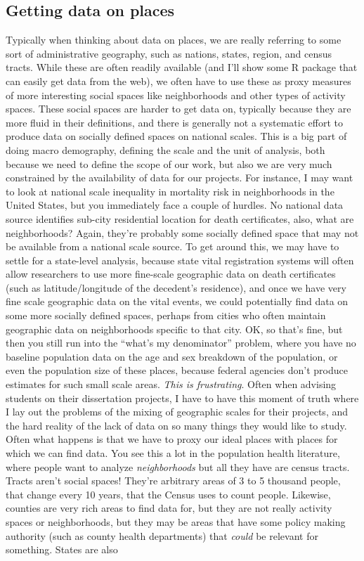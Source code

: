 \documentclass[
]{article}
\begin{document}
\hypertarget{getting-data-on-places-1}{%
\subsection{Getting data on places}\label{getting-data-on-places-1}}

Typically when thinking about data on places, we are really referring to some sort of administrative geography, such as nations, states, region, and census tracts. While these are often readily available (and I'll show some R package that can easily get data from the web), we often have to use these as proxy measures of more interesting social spaces like neighborhoods and other types of activity spaces. These social spaces are harder to get data on, typically because they are more fluid in their definitions, and there is generally not a systematic effort to produce data on socially defined spaces on national scales. This is a big part of doing macro demography, defining the scale and the unit of analysis, both because we need to define the scope of our work, but also we are very much constrained by the availability of data for our projects. For instance, I may want to look at national scale inequality in mortality risk in neighborhoods in the United States, but you immediately face a couple of hurdles. No national data source identifies sub-city residential location for death certificates, also, what are neighborhoods? Again, they're probably some socially defined space that may not be available from a national scale source. To get around this, we may have to settle for a state-level analysis, because state vital registration systems will often allow researchers to use more fine-scale geographic data on death certificates (such as latitude/longitude of the decedent's residence), and once we have very fine scale geographic data on the vital events, we could potentially find data on some more socially defined spaces, perhaps from cities who often maintain geographic data on neighborhoods specific to that city. OK, so that's fine, but then you still run into the ``what's my denominator'' problem, where you have no baseline population data on the age and sex breakdown of the population, or even the population size of these places, because federal agencies don't produce estimates for such small scale areas. \emph{This is frustrating}. Often when advising students on their dissertation projects, I have to have this moment of truth where I lay out the problems of the mixing of geographic scales for their projects, and the hard reality of the lack of data on so many things they would like to study. Often what happens is that we have to proxy our ideal places with places for which we can find data. You see this a lot in the population health literature, where people want to analyze \emph{neighborhoods} but all they have are census tracts. Tracts aren't social spaces! They're arbitrary areas of 3 to 5 thousand people, that change every 10 years, that the Census uses to count people. Likewise, counties are very rich areas to find data for, but they are not really activity spaces or neighborhoods, but they may be areas that have some policy making authority (such as county health departments) that \emph{could} be relevant for something. States are also 
\end{document}

